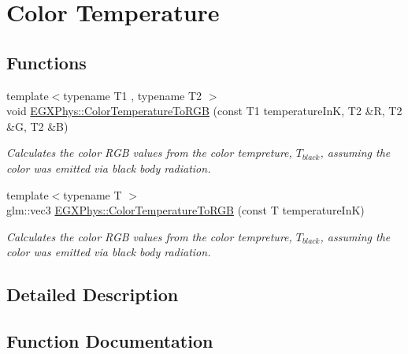 \hypertarget{group___e_g_x_phys-_astrophysics-_color_temperature}{}\section{Color Temperature}
\label{group___e_g_x_phys-_astrophysics-_color_temperature}
\subsection*{Functions}
\begin{DoxyCompactItemize}
\item 
{\footnotesize template$<$typename T1 , typename T2 $>$ }\\void \mbox{\hyperlink{group___e_g_x_phys-_astrophysics-_color_temperature_ga53633ad397d0ee34ff0b5869f41c7c83}{E\+G\+X\+Phys\+::\+Color\+Temperature\+To\+R\+GB}} (const T1 temperature\+InK, T2 \&R, T2 \&G, T2 \&B)
\begin{DoxyCompactList}\small\item\em Calculates the color R\+GB values from the color tempreture, $T_{black}$, assuming the color was emitted via black body radiation. \end{DoxyCompactList}\item 
{\footnotesize template$<$typename T $>$ }\\glm\+::vec3 \mbox{\hyperlink{group___e_g_x_phys-_astrophysics-_color_temperature_gaad787485a232976da96c2c785ce21dad}{E\+G\+X\+Phys\+::\+Color\+Temperature\+To\+R\+GB}} (const T temperature\+InK)
\begin{DoxyCompactList}\small\item\em Calculates the color R\+GB values from the color tempreture, $T_{black}$, assuming the color was emitted via black body radiation. \end{DoxyCompactList}\end{DoxyCompactItemize}


\subsection{Detailed Description}


\subsection{Function Documentation}
\mbox{\label{group___e_g_x_phys-_astrophysics-_color_temperature_ga53633ad397d0ee34ff0b5869f41c7c83}} 
